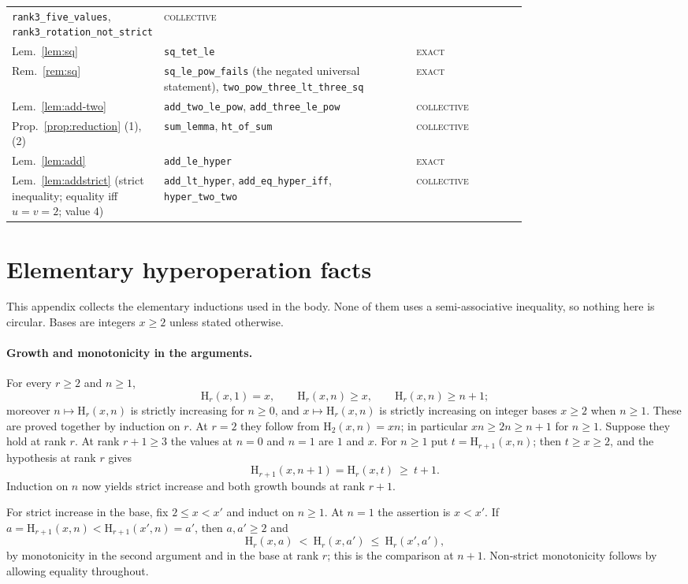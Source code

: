 \documentclass[11pt,a4paper]{article}
\theoremstyle{plain}
\theoremstyle{definition}
\newcommand{\HH}{\mathrm{H}}
\begin{document}
{\begin{longtable}{@{}p{0.27\linewidth}p{0.49\linewidth}l@{}}
  \verb|rank3_five_values|, \verb|rank3_rotation_not_strict| & \textsc{collective}\\
Lem.~\ref{lem:sq} & \verb|sq_tet_le| & \textsc{exact}\\
Rem.~\ref{rem:sq} & \verb|sq_le_pow_fails| (the negated universal statement),
  \verb|two_pow_three_lt_three_sq| & \textsc{exact}\\
Lem.~\ref{lem:add-two} & \verb|add_two_le_pow|, \verb|add_three_le_pow| &
  \textsc{collective}\\
Prop.~\ref{prop:reduction} (1), (2) & \verb|sum_lemma|, \verb|ht_of_sum| &
  \textsc{collective}\\
Lem.~\ref{lem:add} & \verb|add_le_hyper| & \textsc{exact}\\
Lem.~\ref{lem:addstrict} (strict inequality; equality iff $u=v=2$; value $4$) &
  \verb|add_lt_hyper|, \verb|add_eq_hyper_iff|, \verb|hyper_two_two| &
  \textsc{collective}\\
\hline
\hline
\end{longtable}
}

\section{Elementary hyperoperation facts}\label{app:elementary}

This appendix collects the elementary inductions used in the body. None of them uses a
semi-associative inequality, so nothing here is circular. Bases are integers $x\ge2$
unless stated otherwise.

\paragraph{Growth and monotonicity in the arguments.}
For every $r\ge2$ and $n\ge1$,
\[
 \HH_r(x,1)=x,\qquad \HH_r(x,n)\ge x,\qquad \HH_r(x,n)\ge n+1;
\]
moreover $n\mapsto\HH_r(x,n)$ is strictly increasing for $n\ge0$, and
$x\mapsto\HH_r(x,n)$ is strictly increasing on integer bases $x\ge2$ when $n\ge1$.
These are proved together by induction on $r$. At $r=2$ they follow from
$\HH_2(x,n)=xn$; in particular $xn\ge2n\ge n+1$ for $n\ge1$. Suppose they hold at rank
$r$. At rank $r+1\ge3$ the values at $n=0$ and $n=1$ are $1$ and $x$. For $n\ge1$ put
$t=\HH_{r+1}(x,n)$; then $t\ge x\ge2$, and the hypothesis at rank $r$ gives
\[
 \HH_{r+1}(x,n+1)=\HH_r(x,t)\ \ge\ t+1 .
\]
Induction on $n$ now yields strict increase and both growth bounds at rank $r+1$.

For strict increase in the base, fix $2\le x<x'$ and induct on $n\ge1$. At $n=1$ the
assertion is $x<x'$. If $a=\HH_{r+1}(x,n)<\HH_{r+1}(x',n)=a'$, then $a,a'\ge2$ and
\[
 \HH_r(x,a)\ <\ \HH_r(x,a')\ \le\ \HH_r(x',a'),
\]
by monotonicity in the second argument and in the base at rank $r$; this is the
comparison at $n+1$. Non-strict monotonicity follows by allowing equality throughout.
\end{document}
